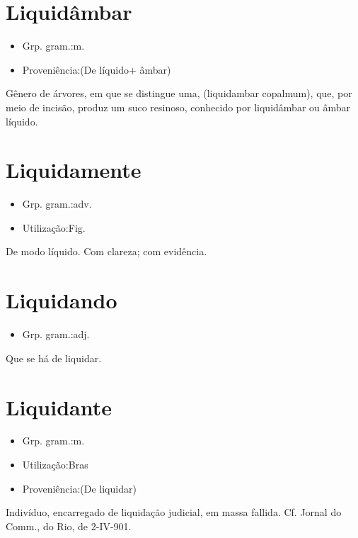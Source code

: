 \section{Liquidâmbar}
\begin{itemize}
\item {Grp. gram.:m.}
\end{itemize}
\begin{itemize}
\item {Proveniência:(De \textunderscore líquido\textunderscore  + \textunderscore âmbar\textunderscore )}
\end{itemize}
Gênero de árvores, em que se distingue uma, (\textunderscore liquidambar copalmum\textunderscore ), que, por meio de incisão, produz um suco resinoso, conhecido por liquidâmbar ou âmbar líquido.
\section{Liquidamente}
\begin{itemize}
\item {Grp. gram.:adv.}
\end{itemize}
\begin{itemize}
\item {Utilização:Fig.}
\end{itemize}
De modo líquido.
Com clareza; com evidência.
\section{Liquidando}
\begin{itemize}
\item {Grp. gram.:adj.}
\end{itemize}
Que se há de liquidar.
\section{Liquidante}
\begin{itemize}
\item {Grp. gram.:m.}
\end{itemize}
\begin{itemize}
\item {Utilização:Bras}
\end{itemize}
\begin{itemize}
\item {Proveniência:(De \textunderscore liquidar\textunderscore )}
\end{itemize}
Indivíduo, encarregado de liquidação judicial, em massa fallida. Cf. \textunderscore Jornal do Comm.\textunderscore , do Rio, de 2-IV-901.
